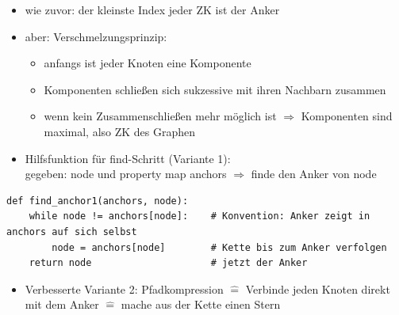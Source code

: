             \begin{itemize}
                \item wie zuvor: der kleinste Index jeder ZK ist der Anker
                \item aber: Verschmelzungsprinzip:
                \begin{itemize}
                    \item anfangs ist jeder Knoten eine Komponente
                    \item Komponenten schließen sich sukzessive mit ihren Nachbarn zusammen
                    \item wenn kein Zusammenschließen mehr möglich ist $\Rightarrow$ Komponenten sind maximal, also ZK des Graphen
                \end{itemize}
                \item Hilfsfunktion für find-Schritt (Variante 1): \\
                gegeben: node und property map anchors $\Rightarrow$ finde den Anker von node
            \end{itemize}

            \begin{verbatim}
def find_anchor1(anchors, node):
    while node != anchors[node]:    # Konvention: Anker zeigt in anchors auf sich selbst
        node = anchors[node]        # Kette bis zum Anker verfolgen
    return node                     # jetzt der Anker
            \end{verbatim}

            \begin{itemize}
                \item Verbesserte Variante 2: Pfadkompression $\widehat{=}$ Verbinde jeden Knoten direkt mit dem Anker $\widehat{=}$ mache aus der Kette einen Stern
            \end{itemize}

